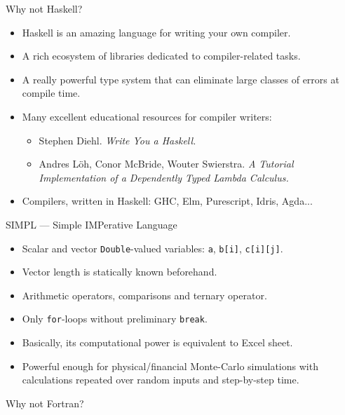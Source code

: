 \documentclass[handout]{beamer}
\begin{document}
\begin{frame}{Why not Haskell?}

\begin{itemize}

\item Haskell is an amazing language for writing your own compiler.

\item A rich ecosystem of libraries dedicated to compiler-related tasks.

\item A really powerful type system that can eliminate large classes of errors at compile time.

\item Many excellent educational resources for compiler writers:
      \begin{itemize}
      \item Stephen Diehl. {\em Write You a Haskell.}
      \item Andres Löh, Conor McBride, Wouter Swierstra. {\em A Tutorial Implementation of a Dependently Typed Lambda Calculus.}
      \end{itemize}

\item Compilers, written in Haskell: GHC, Elm, Purescript, Idris, Agda...
\end{itemize}

\end{frame}

\begin{frame}{SIMPL --- Simple IMPerative Language}

\begin{itemize}

\item Scalar and vector {\tt Double}-valued variables: {\tt a}, {\tt b[i]}, {\tt c[i][j]}.

\item Vector length is statically known beforehand.

\item Arithmetic operators, comparisons and ternary operator.

\item Only {\tt for}-loops without preliminary {\tt break}.

\item Basically, its computational power is equivalent to Excel sheet.

\item Powerful enough for physical/financial Monte-Carlo simulations with calculations repeated over random inputs and step-by-step time.

\end{itemize}

\centerline{Why not Fortran?}

\end{frame}
\end{document}
